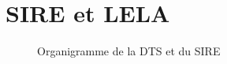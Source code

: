 \chapter{SIRE et LELA}

\begin{figure}[H]
    \centering
    
    \caption{Organigramme de la DTS et du SIRE}
    \label{fig:organigramme-type}
\end{figure}